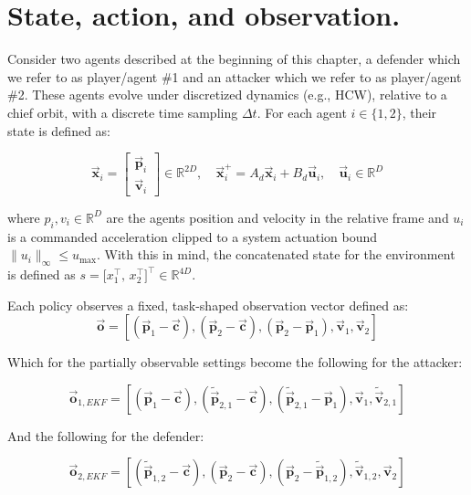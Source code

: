 \section{State, action, and observation.}
\label{sec:state-action-observation}


Consider two agents described at the beginning of this chapter, a defender which we refer to as player/agent \#1 and an attacker which we refer to as player/agent \#2. These agents evolve under discretized dynamics (e.g., HCW), relative to a chief orbit, with a discrete time sampling \(\Delta t\).
For each agent \(i\in\{1,2\}\), their state is defined as:


\[
\vec{\mathbf{x}}_i =
\begin{bmatrix}
\vec{\mathbf{p}}_i\\
\vec{\mathbf{v}}_i
\end{bmatrix}\in\mathbb{R}^{2D},\quad
\vec{\mathbf{x}}_i^+ = A_d\vec{\mathbf{x}}_i + B_d\vec{\mathbf{u}}_i,\quad\vec{\mathbf{u}}_i\in\mathbb{R}^{D}
\]

where \(p_i,v_i\in\mathbb{R}^{D}\) are the agents position and velocity in the relative frame and \(u_i\) is a commanded acceleration clipped to a system actuation bound \(\|u_i\|_\infty\le u_{\max}\).
With this in mind, the concatenated state for the environment is defined as \(s=\big[x_1^\top,\,x_2^\top\big]^\top\in\mathbb{R}^{4D}\).

Each policy observes a fixed, task-shaped observation vector defined as:
\begin{equation}
\label{eq:Full_Obs_Both_Agents}
\boxed{
\vec{\mathbf{o}} = [(\vec{\mathbf{p}}_1-\vec{\mathbf{c}}),(\vec{\mathbf{p}}_2-\vec{\mathbf{c}}), (\vec{\mathbf{p}}_2-\vec{\mathbf{p}}_1), \vec{\mathbf{v}}_1, \vec{\mathbf{v}}_2]
}
\end{equation}


Which for the partially observable settings become the following for the attacker:

\begin{equation}
\label{eq:EKF_Obs_Agent_1}
\boxed{
\vec{\mathbf{o}}_{1,EKF} = [(\vec{\mathbf{p}}_1-\vec{\mathbf{c}}), (\tilde{\vec{\mathbf{p}}}_{2,1}-\vec{\mathbf{c}}), (\tilde{\vec{\mathbf{p}}}_{2,1}-\vec{\mathbf{p}}_1), \vec{\mathbf{v}}_1, \tilde{\vec{\mathbf{v}}}_{2,1}]
} 
\end{equation}


And the following for the defender:

\begin{equation}
\label{eq:EKF_Obs_Agent_2}
\boxed{
\vec{\mathbf{o}}_{2,EKF} = [(\tilde{\vec{\mathbf{p}}}_{1,2}-\vec{\mathbf{c}}), (\vec{\mathbf{p}}_2-\vec{\mathbf{c}}), (\vec{\mathbf{p}}_2-\tilde{\vec{\mathbf{p}}}_{1,2}), \tilde{\vec{\mathbf{v}}}_{1,2}, \vec{\mathbf{v}}_2]
}
\end{equation}

